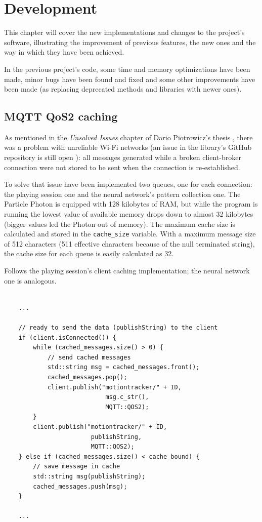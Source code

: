 \chapter{Development}
This chapter will cover the new implementations and changes to the project's software, illustrating the improvement of previous features, the new ones and the way in which they have been achieved.
\bigbreak

In the previous project's code, some time and memory optimizations have been made, minor bugs have been found and fixed and some other improvements have been made (as replacing deprecated methods and libraries with newer ones).

\section{MQTT QoS2 caching}
As mentioned in the \textit{Unsolved Issues} chapter of Dario Piotrowicz's thesis \cite{Pio19}, there was a problem with unreliable Wi-Fi networks (an issue in the library's GitHub repository is still open \cite{githubQos2Issue}): all messages generated while a broken client-broker connection were not stored to be sent when the connection is re-established.

To solve that issue have been implemented two queues, one for each connection: the playing session one and the neural network's pattern collection one. The Particle Photon is equipped with 128 kilobytes of RAM, but while the program is running the lowest value of available memory drops down to almost 32 kilobytes (bigger values led the Photon out of memory). The maximum cache size is calculated and stored in the \texttt{cache\_size} variable. With a maximum message size of 512 characters (511 effective characters because of the null terminated string), the cache size for each queue is easily calculated as 32.

Follows the playing session's client caching implementation; the neural network one is analogous.
\bigbreak

\begin{lstlisting}[style=CPPStyle]

	...

	// ready to send the data (publishString) to the client
	if (client.isConnected()) {
        while (cached_messages.size() > 0) {
			// send cached messages
            std::string msg = cached_messages.front();
            cached_messages.pop();
			client.publish("motiontracker/" + ID,
							msg.c_str(),
							MQTT::QOS2);
        }
		client.publish("motiontracker/" + ID,
						publishString,
						MQTT::QOS2);
    } else if (cached_messages.size() < cache_bound) {
		// save message in cache
        std::string msg(publishString);
        cached_messages.push(msg);
    }

	...

\end{lstlisting}
\bigbreak

